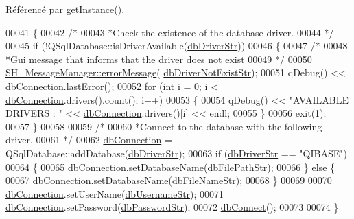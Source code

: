 Référencé par \hyperlink{classSH__DatabaseManager_a31198eb4de0f8b18e3fa0eed09f24d19}{get\-Instance()}.


\begin{DoxyCode}
00041 \{
00042     \textcolor{comment}{/*}
00043 \textcolor{comment}{     *Check the existence of the database driver.
}
00044 \textcolor{comment}{     */}
00045     \textcolor{keywordflow}{if} (!QSqlDatabase::isDriverAvailable(\hyperlink{SH__DatabaseManager_8h_a867ada6d1926e2ded0e68678e02a19c7}{dbDriverStr}))
00046     \{
00047         \textcolor{comment}{/*}
00048 \textcolor{comment}{        *Gui message that informs that the driver does not exist
}
00049 \textcolor{comment}{        */}
00050         \hyperlink{classSH__MessageManager_a0cb4f06cf67539457482ba1c8544eb06}{SH\_MessageManager::errorMessage}(
      \hyperlink{SH__DatabaseManager_8h_adeeb3449586b533bdd3cd5938d501807}{dbDriverNotExistStr});
00051         qDebug() << \hyperlink{classSH__DatabaseManager_a9291f61c3abbba2c4f1567b1d8325f0e}{dbConnection}.lastError();
00052         \textcolor{keywordflow}{for} (\textcolor{keywordtype}{int} i = 0; i < \hyperlink{classSH__DatabaseManager_a9291f61c3abbba2c4f1567b1d8325f0e}{dbConnection}.drivers().count(); i++)
00053         \{
00054             qDebug() << \textcolor{stringliteral}{"AVAILABLE DRIVERS : "} << \hyperlink{classSH__DatabaseManager_a9291f61c3abbba2c4f1567b1d8325f0e}{dbConnection}.drivers()[i] << endl;
00055         \}
00056         exit(1);
00057     \}
00058 
00059     \textcolor{comment}{/*}
00060 \textcolor{comment}{    *Connect to the database with the following driver.
}
00061 \textcolor{comment}{    */}
00062     \hyperlink{classSH__DatabaseManager_a9291f61c3abbba2c4f1567b1d8325f0e}{dbConnection} = QSqlDatabase::addDatabase(\hyperlink{SH__DatabaseManager_8h_a867ada6d1926e2ded0e68678e02a19c7}{dbDriverStr});
00063     \textcolor{keywordflow}{if} (\hyperlink{SH__DatabaseManager_8h_a867ada6d1926e2ded0e68678e02a19c7}{dbDriverStr} == \textcolor{stringliteral}{"QIBASE"})
00064     \{
00065         \hyperlink{classSH__DatabaseManager_a9291f61c3abbba2c4f1567b1d8325f0e}{dbConnection}.setDatabaseName(\hyperlink{SH__DatabaseManager_8h_acee79beb6e5aec996fd46b84264d072a}{dbFilePathStr});
00066     \} \textcolor{keywordflow}{else} \{
00067         \hyperlink{classSH__DatabaseManager_a9291f61c3abbba2c4f1567b1d8325f0e}{dbConnection}.setDatabaseName(\hyperlink{SH__DatabaseManager_8h_a6c6a636455d1d86d7215a52de4bc6828}{dbFileNameStr});
00068     \}
00069 
00070     \hyperlink{classSH__DatabaseManager_a9291f61c3abbba2c4f1567b1d8325f0e}{dbConnection}.setUserName(\hyperlink{SH__DatabaseManager_8h_a15964752bd7d7c2075f3bafca2218411}{dbUsernameStr});
00071     \hyperlink{classSH__DatabaseManager_a9291f61c3abbba2c4f1567b1d8325f0e}{dbConnection}.setPassword(\hyperlink{SH__DatabaseManager_8h_a5dbd4602b69f5a87243d49f9c873ac64}{dbPasswordStr});
00072     \hyperlink{classSH__DatabaseManager_ab634ce39ef483e7ad2fe08d4b8ba74f7}{dbConnect}();
00073 
00074 \}
\end{DoxyCode}
